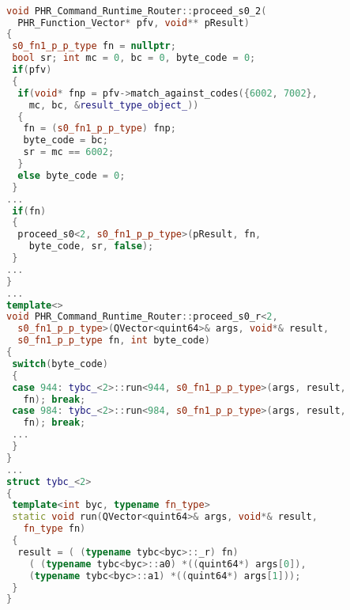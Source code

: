 \begin{lstlisting}[caption={Identifying Function 
 Equivalence Classes},
language = C++, numbers = none, label={lst:figPVMrt},
    basicstyle = \ttfamily\bfseries\tiny, linewidth = .95\linewidth] 

void PHR_Command_Runtime_Router::proceed_s0_2(
  PHR_Function_Vector* pfv, void** pResult)
{
 s0_fn1_p_p_type fn = nullptr;
 bool sr; int mc = 0, bc = 0, byte_code = 0;
 if(pfv)
 {
  if(void* fnp = pfv->match_against_codes({6002, 7002}, 
    mc, bc, &result_type_object_))
  {
   fn = (s0_fn1_p_p_type) fnp;
   byte_code = bc;
   sr = mc == 6002;
  }
  else byte_code = 0;
 } 
... 
 if(fn)
 {
  proceed_s0<2, s0_fn1_p_p_type>(pResult, fn, 
    byte_code, sr, false);
 } 
...
}
...
template<>
void PHR_Command_Runtime_Router::proceed_s0_r<2, 
  s0_fn1_p_p_type>(QVector<quint64>& args, void*& result,
  s0_fn1_p_p_type fn, int byte_code)
{
 switch(byte_code)
 {
 case 944: tybc_<2>::run<944, s0_fn1_p_p_type>(args, result, 
   fn); break;
 case 984: tybc_<2>::run<984, s0_fn1_p_p_type>(args, result, 
   fn); break; 
 ...
 }
}
...
struct tybc_<2>
{
 template<int byc, typename fn_type>
 static void run(QVector<quint64>& args, void*& result,
   fn_type fn)
 {
  result = ( (typename tybc<byc>::_r) fn)
    ( (typename tybc<byc>::a0) *((quint64*) args[0]),  
    (typename tybc<byc>::a1) *((quint64*) args[1]));
 }
}
\end{lstlisting}
